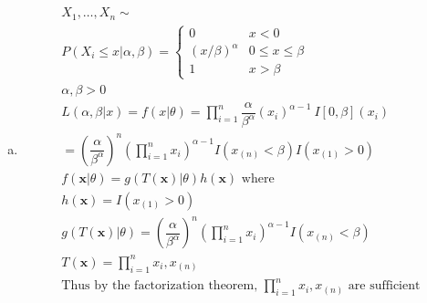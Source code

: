 \documentclass{article}
\newcommand{\B}{\beta}
\newcommand{\prodn}{\prod_{i=1}^{n}}
\begin{document}
\begin{flushleft}
\begin{enumerate}[(a)]
	\item 
\begin{multline*}\\
X_1,\dots,X_n \sim\\
P(X_i\leq x|\alpha,\B)=\begin{cases}
0  & x<0\\
(x/\B)^{\alpha}  & 0\leq x\leq\B\\
1  & x>\B
\end{cases}\\
\alpha,\B>0\\
L(\alpha,\B|x)=f(x|\theta)=\prodn \dfrac{\alpha}{\B^{\alpha}}(x_i)^{\alpha-1} \ I[0,\B](x_i)\\
=\left(\dfrac{\alpha}{\B^\alpha}\right)^n\left(\prodn x_i\right)^{\alpha-1} I(x_{(n)}<\B)I(x_{(1)}>0)\\
f(\bm{x}|\theta)=g(T(\bm{x})|\theta)h(\bm{x}) \text{ where}\\
h(\bm{x})= I(x_{(1)}>0)\\ g(T(\bm{x})|\theta)=\left(\dfrac{\alpha}{\B^\alpha}\right)^n\left(\prodn x_i\right)^{\alpha-1} I(x_{(n)}<\B)\\
T(\bm{x})=\prodn x_i, x_{(n)}\\
\text{Thus by the factorization theorem, } \prodn x_i, x_{(n)} \text{ are sufficient}\\
\end{multline*}
	

\end{enumerate}
\end{flushleft}
\end{document}
